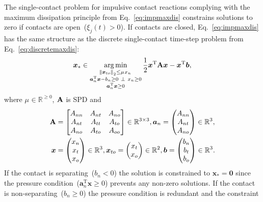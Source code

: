\documentclass[global,twocolumn]{svjour}
\let\vec\bm
\newcommand{\argmin}{\operatornamewithlimits{arg\,min}}
\newcommand{\compl}{~\bot~}
\newcommand{\mat}[1]{{\bf #1}}
\newcommand{\R}{\mathbb{R}}
\newcommand{\transp}{{\mathrm{T}}}
\newcommand{\cof}[1]{\ensuremath{\mu_{#1}}}
\begin{document}
			The single-contact problem for impulsive contact reactions complying with the maximum dissipation principle from
			Eq.~\eqref{eq:impmaxdis} constrains solutions to zero if contacts are open~($\xi_j(t) > 0$). If contacts are closed,
			Eq.~\eqref{eq:impmaxdis} has the same structure as the discrete single-contact time-step problem from
			Eq.~\eqref{eq:discretemaxdis}:
			\begin{equation*}
				\vec x_* \in \argmin_{\substack{\norm{\vec x_{to}}_2 \leq \cof{} x_n \\ \vec{a}_n^\transp \vec x - b_n \geq 0 \compl x_n \geq 0 \\ \vec a_n^\transp \vec x \geq 0}} \frac{1}{2} \vec x^\transp \mat{A} \vec x - \vec x^\transp \vec b,
			\end{equation*}
			where $\cof{} \in \R^{\geq 0}$, $\mat{A}$ is SPD and
			\begin{equation*}
				\begin{split}
					\mat{A} & = \begin{bmatrix} A_{nn} & A_{nt} & A_{no} \\ A_{nt} & A_{tt} & A_{to} \\ A_{no} & A_{to} & A_{oo} \end{bmatrix} \in \R^{3 \times 3}, \vec a_n = \begin{pmatrix} A_{nn} \\ A_{nt} \\ A_{no} \end{pmatrix} \in \R^3, \\
					\vec x & = \begin{pmatrix} x_n \\ x_t \\ x_o \end{pmatrix} \in \R^3, \vec x_{to} = \begin{pmatrix} x_t \\ x_o \end{pmatrix} \in \R^2, \vec b = \begin{pmatrix} b_n \\ b_t \\ b_o \end{pmatrix} \in \R^3.
				\end{split}
			\end{equation*}
			If the contact is separating~($b_n < 0$) the solution is constrained to $\vec x_* = \vec 0$ since the
			pressure condition~($\vec a_n^\transp \vec x \geq 0$) prevents any non-zero solutions.
			If the contact is non-separating~($b_n \geq 0$) the pressure condition is redundant and the constraint
\end{document}
